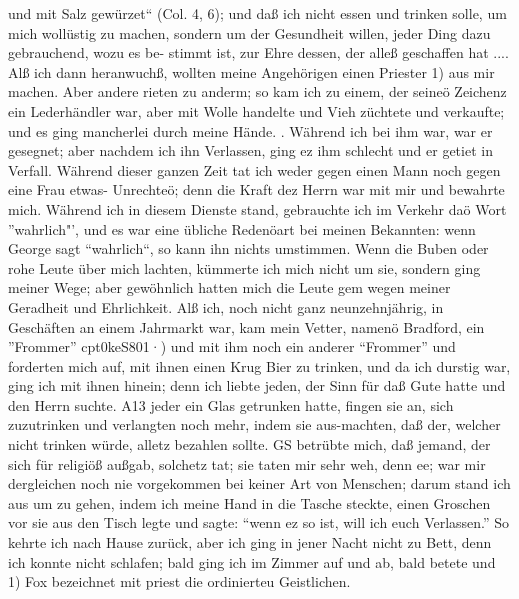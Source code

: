 und mit Salz gewürzet"` (Col. 4, 6); und daß ich nicht essen
und trinken solle, um mich wollüstig zu machen, sondern um der
Gesundheit willen, jeder Ding dazu gebrauchend, wozu es be-
stimmt ist, zur Ehre dessen, der alleß geschaffen hat ....
Alß ich dann heranwuchß, wollten meine Angehörigen einen
Priester 1) aus mir machen. Aber andere rieten zu anderm; so
kam ich zu einem, der seineö Zeichenz ein Lederhändler war, aber
mit Wolle handelte und Vieh züchtete und verkaufte; und es ging
mancherlei durch meine Hände. . Während ich bei ihm war,
war er gesegnet; aber nachdem ich ihn Verlassen, ging ez ihm
schlecht und er getiet in Verfall. Während dieser ganzen Zeit
tat ich weder gegen einen Mann noch gegen eine Frau etwas-
Unrechteö; denn die Kraft dez Herrn war mit mir und bewahrte
mich. Während ich in diesem Dienste stand, gebrauchte ich im
Verkehr daö Wort "'wahrlich"', und es war eine übliche Redenöart
bei meinen Bekannten: wenn George sagt "`wahrlich"`, so kann
ihn nichts umstimmen. Wenn die Buben oder rohe Leute über
mich lachten, kümmerte ich mich nicht um sie, sondern ging meiner
Wege; aber gewöhnlich hatten mich die Leute gem wegen meiner
Geradheit und Ehrlichkeit.
Alß ich, noch nicht ganz neunzehnjährig, in Geschäften an
einem Jahrmarkt war, kam mein Vetter, namenö Bradford, ein
"'Frommer"' cpt0keS801·) und mit ihm noch ein anderer "`Frommer"'
und forderten mich auf, mit ihnen einen Krug Bier zu trinken,
und da ich durstig war, ging ich mit ihnen hinein; denn ich
liebte jeden, der Sinn für daß Gute hatte und den Herrn
suchte. A13 jeder ein Glas getrunken hatte, fingen sie an, sich
zuzutrinken und verlangten noch mehr, indem sie aus-machten,
daß der, welcher nicht trinken würde, alletz bezahlen sollte. GS
betrübte mich, daß jemand, der sich für religiöß außgab, solchetz
tat; sie taten mir sehr weh, denn ee; war mir dergleichen noch
nie vorgekommen bei keiner Art von Menschen; darum stand ich
aus um zu gehen, indem ich meine Hand in die Tasche steckte,
einen Groschen vor sie aus den Tisch legte und sagte: "`wenn ez
so ist, will ich euch Verlassen."' So kehrte ich nach Hause zurück,
aber ich ging in jener Nacht nicht zu Bett, denn ich konnte nicht
schlafen; bald ging ich im Zimmer auf und ab, bald betete und
1) Fox bezeichnet mit priest die ordinierteu Geistlichen.




